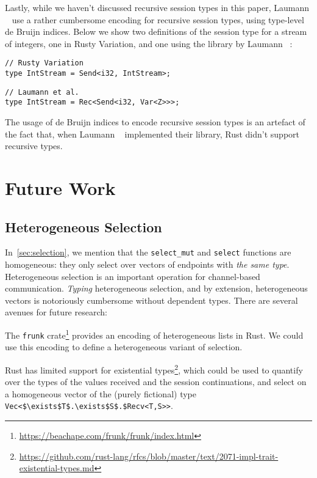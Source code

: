 \documentclass[copyright,creativecommons]{eptcs}
\begin{document}
Lastly, while we haven't discussed recursive session types in this paper, Laumann \etal~\cite{jespersen2015} use a rather cumbersome encoding for recursive session types, using type-level de Bruijn indices. Below we show two definitions of the session type for a stream of integers, one in Rusty Variation, and one using the library by Laumann \etal~\cite{jespersen2015}:

\begin{minipage}{0.5\linewidth}
\begin{lstlisting}
// Rusty Variation
type IntStream = Send<i32, IntStream>;
\end{lstlisting}  
\end{minipage}%
\begin{minipage}{0.5\linewidth}
\begin{lstlisting}
// Laumann et al.
type IntStream = Rec<Send<i32, Var<Z>>>;
\end{lstlisting}  
\end{minipage}

\noindent
The usage of de Bruijn indices to encode recursive session types is an artefact of the fact that, when Laumann \etal~\cite{jespersen2015} implemented their library, Rust didn't support recursive types.


\section{Future Work}\label{sec:future-work}

\subsection{Heterogeneous Selection}
In~\cref{sec:selection}, we mention that the \lstinline{select_mut} and \lstinline{select} functions are homogeneous: they only select over vectors of endpoints with \emph{the same type}. Heterogeneous selection is an important operation for channel-based communication. \emph{Typing} heterogeneous selection, and by extension, heterogeneous vectors is notoriously cumbersome without dependent types. There are several avenues for future research:

The \lstinline{frunk} crate\footnote{\url{https://beachape.com/frunk/frunk/index.html}} provides an encoding of heterogeneous lists in Rust. We could use this encoding to define a heterogeneous variant of selection.

Rust has limited support for existential types\footnote{\url{https://github.com/rust-lang/rfcs/blob/master/text/2071-impl-trait-existential-types.md}}, which could be used to quantify over the types of the values received and the session continuations, and select on a homogeneous vector of the (purely fictional) type \lstinline[mathescape=true]{Vec<$\exists$T$.\exists$S$.$Recv<T,S>>}.
\end{document}
